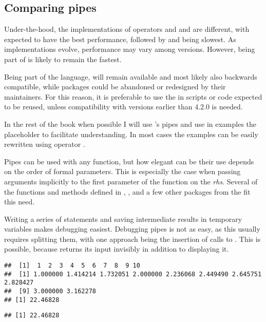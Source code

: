 \documentclass[krantz2]{krantz}\usepackage{knitr}
\begin{document}
\subsection{Comparing pipes}

Under-the-hood, the implementations of operators  \Roperator{\textbar >} and \Roperator{\%>\%} and  are different, with \Roperator{\textbar >} expected to have the best performance, followed by  and \Roperator{\%>\%} being slowest. As implementations evolve, performance may vary among versions. However, \Roperator{\textbar >} being part of \Rlang is likely to remain the fastest.

Being part of the \Rlang language, \Roperator{\textbar >} will remain available and most likely also backwards compatible, while packages could be abandoned or redesigned by their maintainers. For this reason, it is preferable to use the \Roperator{\textbar >} in scripts or code expected to be reused, unless compatibility with \Rlang versions earlier than 4.2.0 is needed.

In the rest of the book when possible I will use \Rlang's pipes and use in examples the \code{\_} placeholder to facilitate understanding. In most cases the examples can be easily rewritten using operator \Roperator{\%>\%}.

Pipes can be used with any \Rlang function, but how elegant can be their use depends on the order of formal parameters. This is especially the case when passing arguments implicitly to the first parameter of the function on the \emph{rhs}. Several of the functions and methods defined in , , and a few other packages from the  fit this need.

Writing a series of statements and saving intermediate results in temporary variables makes debugging easiest.  Debugging pipes is not as easy, as this usually requires splitting them, with one approach being the insertion of calls to . This is possible, because  returns its input invisibly in addition to displaying it.

\begin{knitrout}\footnotesize
{}\color{fgcolor}\begin{kframe}
\begin{alltt}
 \hlstd{() |>} \hlstd{() |>} \hlstd{() |>} \hlstd{() |>} \hlstd{()} \hlkwb{->} 
\end{alltt}
\begin{verbatim}
##  [1]  1  2  3  4  5  6  7  8  9 10
##  [1] 1.000000 1.414214 1.732051 2.000000 2.236068 2.449490 2.645751 2.828427
##  [9] 3.000000 3.162278
## [1] 22.46828
\end{verbatim}
\begin{alltt}
\end{alltt}
\begin{verbatim}
## [1] 22.46828
\end{verbatim}
\end{kframe}
\end{knitrout}
\end{document}
